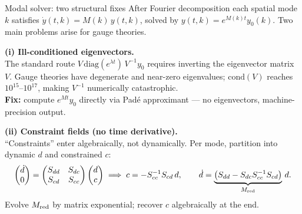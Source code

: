 \begin{frame}{Modal solver: two structural fixes}
  \footnotesize
  After Fourier decomposition each spatial mode $k$ satisfies
  $\dot{y}(t,k)=M(k)\,y(t,k)$, solved by $y(t,k)=e^{M(k)t}y_0(k)$.
  Two main problems arise for gauge theories.

  \vspace{0.3em}
  \textbf{(i) Ill-conditioned eigenvectors.}\\
  The standard route $V\,\mathrm{diag}(e^{\lambda t})\,V^{-1}y_0$ requires inverting the
  eigenvector matrix $V$.  Gauge theories have degenerate and near-zero eigenvalues;
  $\mathrm{cond}(V)$ reaches $10^{15}$--$10^{17}$, making $V^{-1}$ numerically catastrophic.\\[0.15em]
  \textbf{Fix:} compute $e^{Mt}y_0$ directly via Pad\'e approximant --- no eigenvectors, machine-precision output.

  \vspace{0.3em}
  \textbf{(ii) Constraint fields (no time derivative).}\\
  ``Constraints'' enter algebraically, not dynamically.
  Per mode, partition into dynamic $d$ and constrained $c$:
  \[
    \begin{pmatrix}\dot{d}\\0\end{pmatrix}
    =
    \begin{pmatrix}S_{dd}&S_{dc}\\S_{cd}&S_{cc}\end{pmatrix}
    \begin{pmatrix}d\\c\end{pmatrix}
    \;\Longrightarrow\;
    c = -S_{cc}^{-1}S_{cd}\,d,\qquad
    \dot{d} = \underbrace{\bigl(S_{dd}-S_{dc}S_{cc}^{-1}S_{cd}\bigr)}_{M_{\rm red}}\,d.
  \]
  Evolve $M_{\rm red}$ by matrix exponential; recover $c$ algebraically at the end.
\end{frame}
